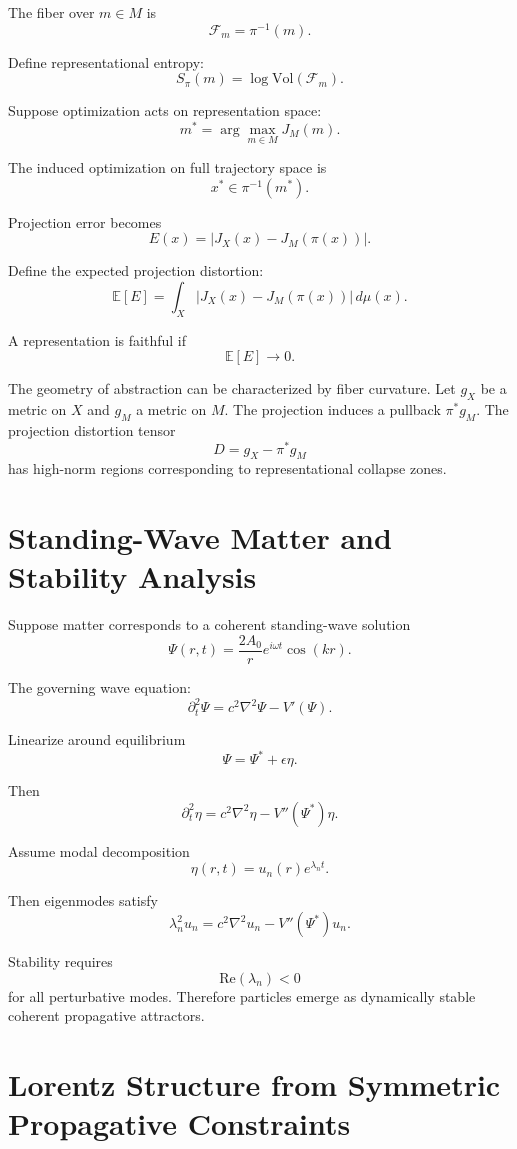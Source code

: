 \documentclass[12pt,a4paper]{article}
\begin{document}
The fiber over \(m\in M\) is
\[
\mathcal{F}_m
=
\pi^{-1}(m).
\]

Define representational entropy:
\[
S_\pi(m)
=
\log\mathrm{Vol}(\mathcal{F}_m).
\]

Suppose optimization acts on representation space:
\[
m^\ast
=
\arg\max_{m\in M}J_M(m).
\]

The induced optimization on full trajectory space is
\[
x^\ast
\in
\pi^{-1}(m^\ast).
\]

Projection error becomes
\[
E(x)
=
|J_X(x)-J_M(\pi(x))|.
\]

Define the expected projection distortion:
\[
\mathbb{E}[E]
=
\int_X
|J_X(x)-J_M(\pi(x))|
\,d\mu(x).
\]

A representation is faithful if
\[
\mathbb{E}[E]\to 0.
\]

The geometry of abstraction can be characterized by fiber curvature. Let \(g_X\) be a metric on \(X\) and \(g_M\) a metric on \(M\). The projection induces a pullback \(\pi^\ast g_M\). The projection distortion tensor
\[
D
=
g_X-\pi^\ast g_M
\]
has high-norm regions corresponding to representational collapse zones.

\section{Standing-Wave Matter and Stability Analysis}

Suppose matter corresponds to a coherent standing-wave solution
\[
\Psi(r,t)
=
\frac{2A_0}{r}
e^{i\omega t}
\cos(kr).
\]

The governing wave equation:
\[
\partial_t^2\Psi
=
c^2\nabla^2\Psi
-
V'(\Psi).
\]

Linearize around equilibrium
\[
\Psi=\Psi^\ast+\epsilon\eta.
\]

Then
\[
\partial_t^2\eta
=
c^2\nabla^2\eta
-
V''(\Psi^\ast)\eta.
\]

Assume modal decomposition
\[
\eta(r,t)
=
u_n(r)e^{\lambda_n t}.
\]

Then eigenmodes satisfy
\[
\lambda_n^2u_n
=
c^2\nabla^2u_n
-
V''(\Psi^\ast)u_n.
\]

Stability requires
\[
\mathrm{Re}(\lambda_n)<0
\]
for all perturbative modes. Therefore particles emerge as dynamically stable coherent propagative attractors.

\section{Lorentz Structure from Symmetric Propagative Constraints}
\end{document}

